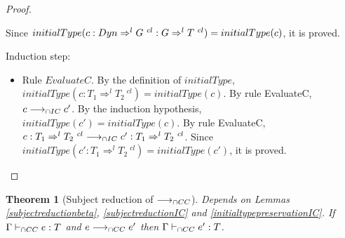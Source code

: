 \documentclass[a4paper]{article}
\newtheorem{theorem}{Theorem}
\begin{document}
\begin{proof}
\begin{itemize}
    Since $initialType(c : Dyn \Rightarrow^l G\ ^{cl} : G \Rightarrow^l T\ ^{cl}) = initialType(c)$, it is proved.
\end{itemize}
Induction step:
\begin{itemize}
    \item Rule $EvaluateC$.
    By the definition of $initialType$, $initialType(c : T_1 \Rightarrow^l T_2\ ^{cl}) = initialType(c)$.
    By rule EvaluateC, $c \longrightarrow_{\cap IC} c'$.
    By the induction hypothesis, $initialType(c') = initialType(c)$.
    By rule EvaluateC, $c : T_1 \Rightarrow^l T_2\ ^{cl} \icos c' : T_1 \Rightarrow^l T_2\ ^{cl}$.
    Since $initialType(c' : T_1 \Rightarrow^l T_2\ ^{cl}) = initialType(c')$, it is proved.
\end{itemize}
\end{proof}

\begin{theorem}[Subject reduction of $\longrightarrow_{\cap CC}$]
\label{subjectreduction}
Depends on Lemmas \ref{subjectreductionbeta}, \ref{subjectreductionIC} and \ref{initialtypepreservationIC}.
If $\Gamma \vdash_{\cap CC} e : T$ and $e \longrightarrow_{\cap CC} e'$ then $\Gamma \vdash_{\cap CC} e' : T$.
\end{theorem}
\end{document}
